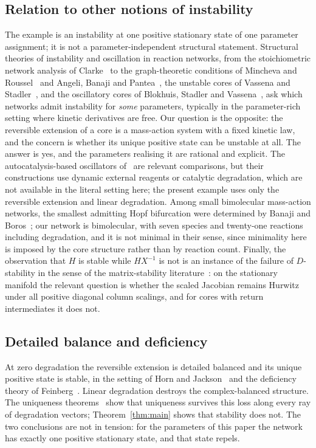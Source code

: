 \documentclass[11pt,a4paper]{article}
\theoremstyle{plain}
\theoremstyle{definition}
\theoremstyle{remark}
\numberwithin{equation}{section}
\begin{document}
\subsection*{Relation to other notions of instability}
The example is an instability at one positive stationary state of one parameter assignment; it is not a parameter-independent structural statement. Structural theories of instability and oscillation in reaction networks, from the stoichiometric network analysis of Clarke~\cite{Clarke1980} to the graph-theoretic conditions of Mincheva and Roussel~\cite{MinchevaRoussel2007} and Angeli, Banaji and Pantea~\cite{AngeliBanajiPantea2014}, the unstable cores of Vassena and Stadler~\cite{VassenaStadler2024}, and the oscillatory cores of Blokhuis, Stadler and Vassena~\cite{BSV2025}, ask which networks admit instability for \emph{some} parameters, typically in the parameter-rich setting where kinetic derivatives are free. Our question is the opposite: the reversible extension of a core is a mass-action system with a fixed kinetic law, and the concern is whether its unique positive state can be unstable at all. The answer is yes, and the parameters realising it are rational and explicit. The autocatalysis-based oscillators of~\cite{BSV2025} are relevant comparisons, but their constructions use dynamic external reagents or catalytic degradation, which are not available in the literal setting here; the present example uses only the reversible extension and linear degradation. Among small bimolecular mass-action networks, the smallest admitting Hopf bifurcation were determined by Banaji and Boros~\cite{BanajiBoros2023}; our network is bimolecular, with seven species and twenty-one reactions including degradation, and it is not minimal in their sense, since minimality here is imposed by the core structure rather than by reaction count. Finally, the observation that $H$ is stable while $HX^{-1}$ is not is an instance of the failure of $D$-stability in the sense of the matrix-stability literature~\cite{Kushel2019}: on the stationary manifold the relevant question is whether the scaled Jacobian remains Hurwitz under all positive diagonal column scalings, and for cores with return intermediates it does not.

\subsection*{Detailed balance and deficiency}
At zero degradation the reversible extension is detailed balanced and its unique positive state is stable, in the setting of Horn and Jackson~\cite{HJ72} and the deficiency theory of Feinberg~\cite{Fei19}. Linear degradation destroys the complex-balanced structure. The uniqueness theorems~\cite{TypeIIpos,TypeIImixed} show that uniqueness survives this loss along every ray of degradation vectors; Theorem~\ref{thm:main} shows that stability does not. The two conclusions are not in tension: for the parameters of this paper the network has exactly one positive stationary state, and that state repels.
\end{document}
